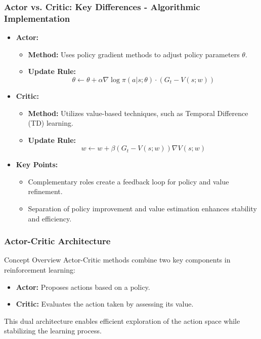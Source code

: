 \documentclass[aspectratio=169]{beamer}
\begin{document}
\begin{frame}[fragile]
    \frametitle{Actor vs. Critic: Key Differences - Algorithmic Implementation}
    
    \begin{itemize}
        \item \textbf{Actor:}
        \begin{itemize}
            \item \textbf{Method:} Uses policy gradient methods to adjust policy parameters \( \theta \).
            \item \textbf{Update Rule:}
            \begin{equation}
                \theta \leftarrow \theta + \alpha \nabla \log \pi(a|s; \theta) \cdot (G_t - V(s; w))
            \end{equation}
            \end{itemize}
        
        \item \textbf{Critic:}
        \begin{itemize}
            \item \textbf{Method:} Utilizes value-based techniques, such as Temporal Difference (TD) learning.
            \item \textbf{Update Rule:}
            \begin{equation}
                w \leftarrow w + \beta (G_t - V(s; w)) \nabla V(s; w)
            \end{equation}
        \end{itemize}
        
        \item \textbf{Key Points:}
        \begin{itemize}
            \item Complementary roles create a feedback loop for policy and value refinement.
            \item Separation of policy improvement and value estimation enhances stability and efficiency.
        \end{itemize}
    \end{itemize}
\end{frame}

\begin{frame}[fragile]
    \frametitle{Actor-Critic Architecture}
    \begin{block}{Concept Overview}
        Actor-Critic methods combine two key components in reinforcement learning:
        \begin{itemize}
            \item \textbf{Actor:} Proposes actions based on a policy.
            \item \textbf{Critic:} Evaluates the action taken by assessing its value.
        \end{itemize}
        This dual architecture enables efficient exploration of the action space while stabilizing the learning process.
    \end{block}
\end{frame}
\end{document}
